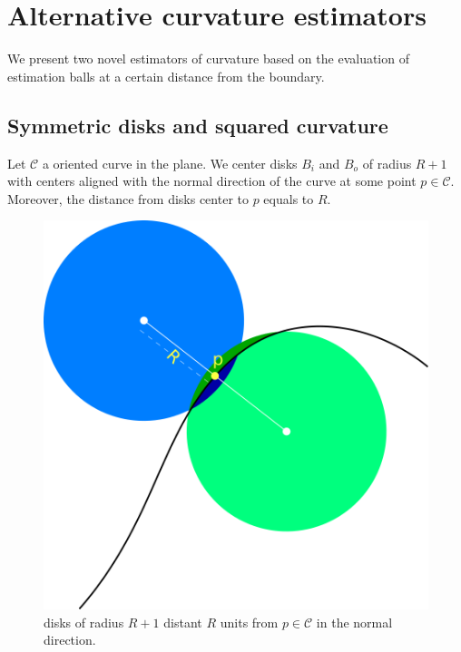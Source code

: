 \chapter{Alternative curvature estimators}\label{chapter:alternative-curvature-estimators}

We present two novel estimators of curvature based on the evaluation of estimation balls at a certain distance from the boundary. 

\section{Symmetric disks and squared curvature}

Let $\mathcal{C}$ a oriented curve in the plane. We center disks $B_i$ and $B_o$ of radius $R+1$ with centers aligned with the normal direction of the curve at some point $p \in \mathcal{C}$. Moreover, the distance from disks center to $p$ equals to $R$.

\begin{figure}[h!]\label{fig:r-separated-disks}
\center
\includegraphics[scale=0.35]{figures/appendix-max-energy/r-separated-disks.png}
\caption{disks of radius $R+1$ distant $R$ units from $p\in \mathcal{C}$ in the normal direction.}
\end{figure}

